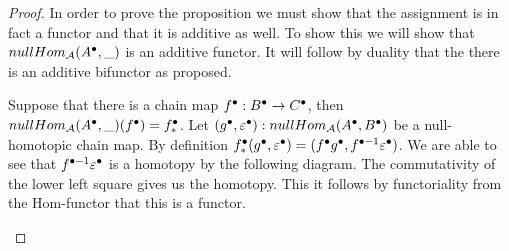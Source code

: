     \begin{proof}
        In order to prove the proposition we must show that the assignment is in fact a functor and that it is additive as well. To show this we will show that $nullHom_{\mathcal{A}}(A^{\bullet},\_)$ is an additive functor. It will follow by duality that the there is an additive bifunctor as proposed.
        
        Suppose that there is a chain map $f^{\bullet}:B^{\bullet}\rightarrow C^{\bullet}$, then $nullHom_{\mathcal{A}}(A^{\bullet},\_)(f^{\bullet})=f^{\bullet}_*$. Let $(g^{\bullet},\varepsilon^{\bullet}):nullHom_{\mathcal{A}}(A^{\bullet},B^{\bullet})$ be a null-homotopic chain map. By definition $f^{\bullet}_*(g^{\bullet},\varepsilon^{\bullet})=(f^{\bullet}g^{\bullet},f^{\bullet-1}\varepsilon^{\bullet})$. We are able to see that $f^{\bullet-1}\varepsilon^{\bullet}$ is a homotopy by the following diagram. The commutativity of the lower left square gives us the homotopy. This it follows by functoriality from the Hom-functor that this is a functor.
        \begin{center}
        \end{center}


\end{proof}
